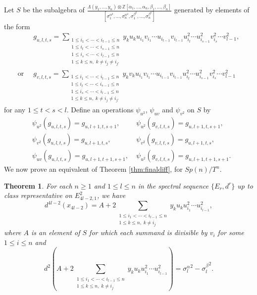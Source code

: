 \documentclass{article}
\theoremstyle{plain}
\newtheorem{thm}{Theorem}[section]
\theoremstyle{definition}
\numberwithin{thm}{section}
\begin{document}
		Let $S$ be the subalgebra of
		$\frac{\Lambda(y_1,\dots,y_n)\otimes\mathbb{Z}[\alpha_1,\dots,\alpha_n,\beta_1,\dots,\beta_n]}
		{[\sigma^{\alpha^2}_1,\dots,\sigma^{\alpha^2}_n,\sigma^{\beta^2}_1,\dots,\sigma^{\beta^2}_n]}$
		generated by elements of the form
		\begin{align*}
										&g_{u,l,t,s}=\sum_{\substack{1\leq i_1<\cdots<i_{t-1}\leq n \\ 1\leq i_{t}<\cdots<i_{s-1}\leq n 
																			 \\ 1\leq i_s<\cdots<i_{l-1}\leq n \\ 1\leq k \leq n, \; k\neq i_j \neq i_{j'} }}
										{y_ku_ku_{i_1}v_{i_1}\cdots u_{i_{t-1}}v_{i_{t-1}}u^2_{i_{t}}\cdots u^2_{i_{s-1}}v_{i_{s}}^2\cdots v^2_{l-1}}, \\
			\text{or}\;\;	&g_{v,l,t,s}=\sum_{\substack{1\leq i_1<\cdots<i_{t-1}\leq n \\ 1\leq i_{t}<\cdots<i_{s-1}\leq n 
																			\\ 1\leq i_s<\cdots<i_{l-1}\leq n \\ 1\leq k \leq n, \; k\neq i_j \neq i_{j'} }}
										{y_kv_ku_{i_1}v_{i_1}\cdots u_{i_{t-1}}v_{i_{t-1}}u^2_{i_{t}}\cdots u^2_{i_{s-1}}v_{i_{s}}^2\cdots v^2_{l-1}}
		\end{align*}
		for any $1\leq t<s< l$.
		Define an operations $\psi_{u^2}$, $\psi_{uv}$ and $\psi_{v^2}$ on $S$ by
		\begin{align*}
			&\psi_{u^2}(g_{u,l,t,s})=g_{u,l+1,t,s+1}, 	\; &\psi_{u^2}(g_{v,l,t,s})=g_{u,l+1,t,s+1},\;\;\; \\
			&\psi_{v^2}(g_{u,l,t,s})=g_{u,l+1,t,s}, 		\; &\psi_{v^2}(g_{v,l,t,s})=g_{u,l+1,t,s}, \;\;\;\;\;\:\:\\
			&\psi_{uv} (g_{u,l,t,s})=g_{u,l+1,t+1,s+1}, \; &\psi_{u^2}(g_{v,l,t,s})=g_{u,l+1,t+1,s+1}.
		\end{align*}
		We now prove an equivalent of Theorem \ref{thm:finaldiff}, for $Sp(n)/T^n$.
		
		\begin{thm}\label{thm:SpPathDiff}
			For each $n\geq 1$ and $1\leq l \leq n$ in the spectral sequence $\{ E_r,d^r \}$ up to class representative on $E^2_{4l-2,1}$, we have
			\begin{equation*}
				d^{4l-2}(x_{4l-2})=A+2\sum_{\substack{1\leq i_1<\cdots<i_{l-1}\leq n \\ 1\leq k \leq n, \; k\neq i_j }}{y_{k}u_{k}u_{i_1}^2\cdots u_{i_{l-1}}^2},
			\end{equation*}
			where $A$ is an element of $S$ for which each summand is divisible by $v_i$ for some $1\leq i \leq n$
			and
			\begin{equation*}
				d^2(A+2\sum_{\substack{1\leq i_1<\cdots<i_{l-1}\leq n \\ 1\leq k \leq n, \; k\neq i_j }}{y_{k}u_{k}u_{i_1}^2\cdots u_{i_{l-1}}^2})
				={\sigma_l^\alpha}^2-{\sigma_l^\beta}^2.
			\end{equation*}
		\end{thm}
		
\end{document}
